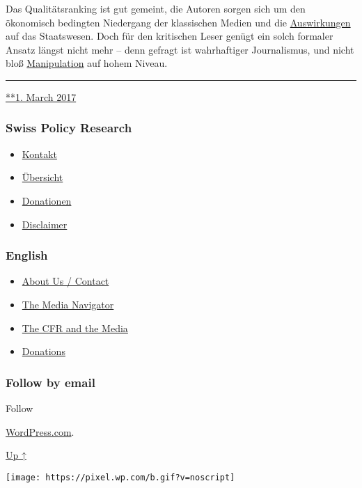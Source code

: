 Das Qualitätsranking ist gut gemeint, die Autoren sorgen sich um den
ökonomisch bedingten Niedergang der klassischen Medien und die
\href{https://www.nzz.ch/feuilleton/medien/was-die-medien-fuer-die-schweizer-demokratie-leisten-ld.1416854}{Auswirkungen}
auf das Staatswesen. Doch für den kritischen Leser genügt ein solch
formaler Ansatz längst nicht mehr -- denn gefragt ist wahrhaftiger
Journalismus, und nicht bloß
\href{https://swprs.org/der-propaganda-schluessel/}{Manipulation} auf
hohem Niveau.

\begin{center}\rule{0.5\linewidth}{\linethickness}\end{center}

\href{https://swprs.org/2017/03/01/medienqualitaet/}{**1. March 2017}

\hypertarget{swiss-policy-research}{%
\subsubsection{Swiss Policy Research}\label{swiss-policy-research}}

\begin{itemize}
\tightlist
\item
  \href{https://swprs.org/kontakt/}{Kontakt}
\item
  \href{https://swprs.org/uebersicht/}{Übersicht}
\item
  \href{https://swprs.org/donationen/}{Donationen}
\item
  \href{https://swprs.org/disclaimer/}{Disclaimer}
\end{itemize}

\hypertarget{english}{%
\subsubsection{English}\label{english}}

\begin{itemize}
\tightlist
\item
  \href{https://swprs.org/contact/}{About Us / Contact}
\item
  \href{https://swprs.org/media-navigator/}{The Media Navigator}
\item
  \href{https://swprs.org/the-american-empire-and-its-media/}{The CFR
  and the Media}
\item
  \href{https://swprs.org/donations/}{Donations}
\end{itemize}

\hypertarget{follow-by-email}{%
\subsubsection{Follow by email}\label{follow-by-email}}

Follow

\href{https://wordpress.com/?ref=footer_custom_com}{WordPress.com}.

\protect\hyperlink{}{Up ↑}

\texttt{[image: https://pixel.wp.com/b.gif?v=noscript]}
